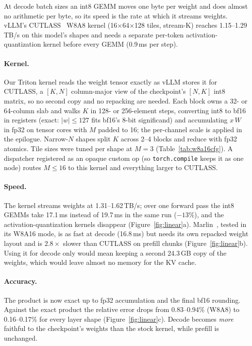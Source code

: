 \documentclass[acmtog,nonacm,screen]{acmart}
\newcommand{\ms}{\,ms\xspace}
\begin{document}
At decode batch sizes an int8 GEMM moves one byte per weight and does almost no arithmetic per byte, so its speed is
the rate at which it streams weights. vLLM's CUTLASS~\cite{nvidia_cutlass} W8A8 kernel (16$\times$64$\times$128 tiles,
stream-K) reaches 1.15--1.29\,TB/s on this model's shapes and needs a separate per-token activation-quantization
kernel before every GEMM (0.9\ms per step).

\paragraph{Kernel.} Our Triton kernel reads the weight tensor exactly as vLLM stores it for CUTLASS, a $[K, N]$
column-major view of the checkpoint's $[N, K]$ int8 matrix, so no second copy and no repacking are needed. Each block
owns a 32- or 64-column slab and walks $K$ in 128- or 256-element steps, converting int8 to bf16 in registers (exact:
$|w| \le 127$ fits bf16's 8-bit significand) and accumulating $x\,W$ in fp32 on tensor cores with $M$ padded to 16; the
per-channel scale is applied in the epilogue. Narrow-$N$ shapes split $K$ across 2--4 blocks and reduce with fp32
atomics. Tile sizes were tuned per shape at $M{=}3$ (Table~\ref{tab:w8a16cfg}). A dispatcher registered as an opaque
custom op (so \texttt{torch.compile} keeps it as one node) routes $M \le 16$ to this kernel and everything larger to
CUTLASS.

\paragraph{Speed.} The kernel streams weights at 1.31--1.62\,TB/s; over one forward pass the int8 GEMMs take 17.1\ms
instead of 19.7\ms in the same run ($-13\%$), and the activation-quantization kernels disappear
(Figure~\ref{fig:linear}a). Marlin~\cite{frantar2025marlin}, tested in its W8A16 mode, is as fast at decode (16.8\ms)
but needs its own repacked weight layout and is $2.8\times$ slower than CUTLASS on prefill chunks
(Figure~\ref{fig:linear}b). Using it for decode only would mean keeping a second 24.3\,GB copy of the weights, which
would leave almost no memory for the KV cache.

\paragraph{Accuracy.} The product is now exact up to fp32 accumulation and the final bf16 rounding. Against the exact
product the relative error drops from 0.83--0.94\% (W8A8) to 0.16--0.17\% for every layer shape
(Figure~\ref{fig:linear}c). Decode becomes \emph{more} faithful to the checkpoint's weights than the stock kernel,
while prefill is unchanged.
\end{document}
